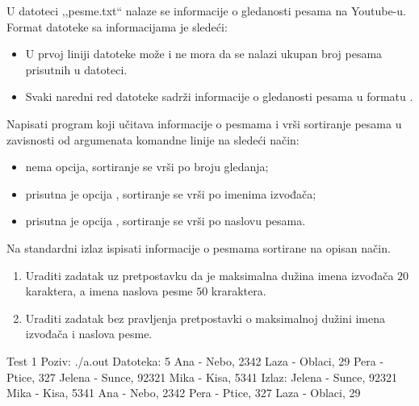 \begin{Exercise}[label=333]
U datoteci ,,pesme.txt`` nalaze se informacije o gledanosti pesama
na Youtube-u. 
Format datoteke sa informacijama je sledeći:
\begin{itemize}
\item U prvoj liniji datoteke može i ne mora da se nalazi ukupan broj pesama prisutnih u datoteci.
\item Svaki naredni red datoteke sadrži
informacije o gledanosti pesama u formatu . 
\end{itemize}
Napisati program koji učitava
informacije o pesmama i vrši sortiranje pesama u zavisnosti od
argumenata komandne linije na sledeći način:
\begin{itemize}
\item nema opcija, sortiranje se vrši po broju gledanja;
\item prisutna je opcija , sortiranje se vrši po imenima izvođača;
\item prisutna je opcija , sortiranje se vrši po naslovu pesama.
\end{itemize}
Na standardni izlaz ispisati informacije o pesmama sortirane na opisan način.

\begin{enumerate}
\item Uraditi zadatak uz pretpostavku da 
je maksimalna dužina imena izvođača $20$ karaktera, a imena naslova pesme $50$ kraraktera.
\item Uraditi zadatak bez pravljenja pretpostavki o maksimalnoj dužini imena izvođača i naslova pesme.
\end{enumerate}



\begin{miditest}
\begin{test}{Test 1}
Poziv: ./a.out
Datoteka:  5
           Ana - Nebo, 2342
           Laza - Oblaci, 29
           Pera - Ptice, 327
           Jelena - Sunce, 92321
           Mika - Kisa, 5341
Izlaz:     Jelena - Sunce, 92321
           Mika - Kisa, 5341
           Ana - Nebo, 2342
           Pera - Ptice, 327
           Laza - Oblaci, 29
\end{test}
\end{miditest}
\end{Exercise}
\begin{Answer}[ref=333]
\end{Answer}


